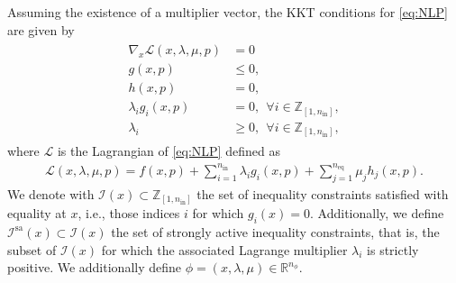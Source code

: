 \documentclass[journal,twoside,web,final]{ieeecolor}
\theoremstyle{definition}
\newcommand{\R}{\mathbb{R}}
\newcommand{\Z}{\mathbb{Z}}
\begin{document}
Assuming the existence of a multiplier vector, the KKT conditions for \cref{eq:NLP} are given by
\begin{align}
\begin{split}
\nabla_x \mathcal{L}(x,\lambda,\mu,p) & = 0\\
g(x,p) &\leq 0,\\
h(x,p) & = 0,\\
\lambda_i g_{i}(x,p) & = 0,~~ \forall i\in\Z_{[1,n_\text{in}]},\\
\lambda_i &\geq 0,~~ \forall i\in\Z_{[1,n_\text{in}]},
\end{split}\label{eq:KKT}
\end{align}
where $\mathcal{L}$ is the Lagrangian of \cref{eq:NLP} defined as
\begin{align*}
\mathcal{L}(x,\lambda,\mu,p) = f(x,p) + \sum_{i=1}^{n_\text{in}} \lambda_i g_i(x,p) + \sum_{j=1}^{n_\text{eq}} \mu_j h_j(x,p).
\end{align*}
%
We denote with $\mathcal{I}(x) \subset \Z_{[1,n_\text{in}]}$ the set of inequality constraints satisfied with equality at $x$, i.e., those indices $i$ for which $g_i(x)=0$. Additionally, we define $\mathcal{I}^\text{sa}(x) \subset \mathcal{I}(x)$ the set of strongly active inequality constraints, that is, the subset of $\mathcal{I}(x)$ for which the associated Lagrange multiplier $\lambda_i$ is strictly positive. We additionally define $\phi=(x,\lambda,\mu)\in\R^{n_\phi}$.
\end{document}
